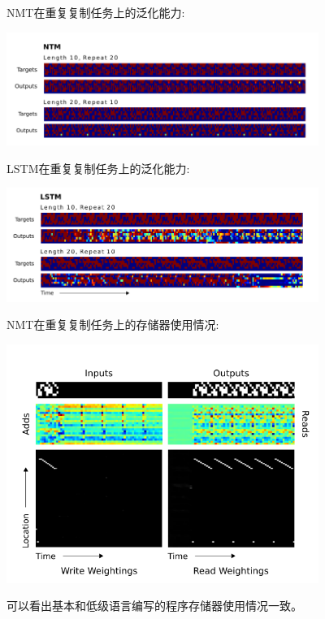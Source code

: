 \documentclass{article} %
\begin{document}
\begin{CJK*}{UTF8}{gkai}
NMT在重复复制任务上的泛化能力:
\begin{center}
\includegraphics[width=4in]{nmt-generalisation-on-the-repeat-copy-task.png}
\end{center}

LSTM在重复复制任务上的泛化能力:
\begin{center}
\includegraphics[width=4in]{lstm-generalisation-on-the-repeat-copy-task.png}
\end{center}

NMT在重复复制任务上的存储器使用情况:
\begin{center}
\includegraphics[width=4in]{nmt-memory-use-during-the-repeat-copy-task.png}
\end{center}
可以看出基本和低级语言编写的程序存储器使用情况一致。

\end{CJK*}
\end{document}

